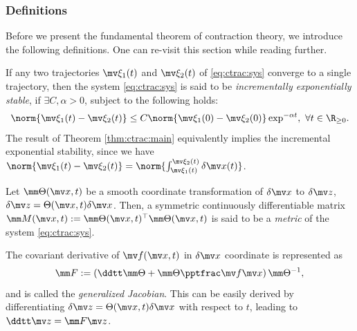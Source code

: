 \subsubsection{Definitions}

Before we present the fundamental theorem of contraction theory, we introduce the following definitions.
One can re-visit this section while reading further.

\begin{definition}  
    If any two trajectories $\mv\xi_1(t)$ and $\mv\xi_2(t)$ of \eqref{eq:ctrac:sys} converge to a single trajectory, then the system \eqref{eq:ctrac:sys} is said to be \textit{incrementally exponentially stable}, if $\exists C,\alpha>0$, subject to the following holds:
    \begin{equation}      
        \norm{\mv\xi_1(t)-\mv\xi_2(t)}
        \le 
        C
        \norm{\mv\xi_1(0)-\mv\xi_2(0)}
        \exp^{-\alpha t}
        ,\ \forall t\in\R_{\ge 0}
        .
    \end{equation}
    The result of Theorem \ref{thm:ctrac:main} equivalently implies the incremental exponential stability, since we have $\norm{\mv\xi_1(t)-\mv\xi_2(t)}= \norm{\int_{\mv\xi_1(t)}^{\mv\xi_2(t)}\delta\bdx(t)}$.
    \label{def:inc_exp_stable}
\end{definition}

\begin{definition}
    Let $\mm\Theta(\bdx,t)$ be a smooth coordinate transformation of $\delta\bdx$ to $\delta\bdz$, \ie $\delta\bdz = \Theta(\bdx,t)\delta\bdx$.
    Then, a symmetric continuously differentiable matrix $\mm M(\bdx,t):=\mm\Theta(\bdx,t)^\top\mm\Theta(\bdx,t)$ is said to be a \textit{metric} of the system \eqref{eq:ctrac:sys}.
    \label{def:metric}
\end{definition}

\begin{definition}
    The covariant derivative of $\mv f(\bdx,t)$ in $\delta\bdx$ coordinate is represented as 
    \begin{equation}
        \mm F
        :=
        \left(
            \ddtt\mm\Theta
            +
            \mm\Theta\tpfpx
        \right)
        \mm\Theta^{-1}
        ,
    \end{equation}
    and is called the \textit{generalized Jacobian}.
    This can be easily derived by differentiating $\delta\bdz = \Theta(\bdx,t)\delta\bdx$ with respect to $t$, leading to $\ddtt\bdz=\mm F\bdz$.
    \label{def:gen_jac}
\end{definition}

